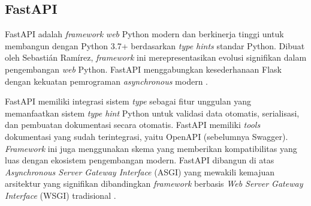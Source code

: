 \subsection{FastAPI}
\label{subsec:fastapi}

FastAPI adalah \emph{framework} \emph{web} Python modern dan berkinerja tinggi untuk membangun \api{} dengan Python 3.7+ berdasarkan \emph{type hints} standar Python. Dibuat oleh Sebastián Ramírez, \emph{framework} ini merepresentasikan evolusi signifikan dalam pengembangan \emph{web} Python. FastAPI menggabungkan kesederhanaan Flask dengan kekuatan pemrograman \emph{asynchronous} modern \parencite{ramirez2020fastapi}.

FastAPI memiliki integrasi sistem \emph{type} sebagai fitur unggulan yang memanfaatkan sistem \emph{type hint} Python untuk validasi data otomatis, serialisasi, dan pembuatan dokumentasi secara otomatis. FastAPI memiliki \emph{tools} dokumentasi yang sudah terintegrasi, yaitu OpenAPI (sebelumnya Swagger). \emph{Framework} ini juga menggunakan skema \json{} yang memberikan kompatibilitas yang luas dengan ekosistem pengembangan modern. FastAPI dibangun di atas \emph{Asynchronous Server Gateway Interface} (ASGI) yang mewakili kemajuan arsitektur yang signifikan dibandingkan \emph{framework} berbasis \emph{Web Server Gateway Interface} (WSGI) tradisional \parencite{ramirez2020fastapi}. 




